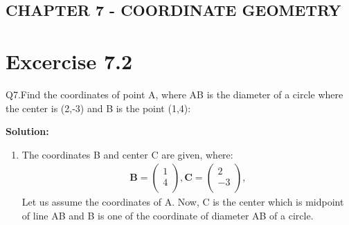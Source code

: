 \documentclass[12pt]{article}
\newcommand{\solution}{\noindent \textbf{Solution: }}
\newcommand{\myvec}[1]{\ensuremath{\begin{pmatrix}#1\end{pmatrix}}}
\let\vec\mathbf
\begin{document}
\begin{center}
\section*{CHAPTER 7 - COORDINATE GEOMETRY}

\end{center}
\section*{Excercise 7.2}

Q7.Find the coordinates of point A, where AB is the diameter of a circle where the center is (2,-3) and B is the point (1,4):

\solution
\begin{enumerate}
\item The coordinates B and center C are given, where:
	\begin{align}
	\vec{B} = \myvec{
		1\\
	    4\\
		},
	\vec{C} = \myvec{
	    2\\
	   -3\\
		},
	\end{align}
Let us assume the coordinates of A. Now, C is the center which is midpoint of line AB and B is one of the coordinate of diameter AB of a circle.
		

\end{enumerate}
\end{document}
